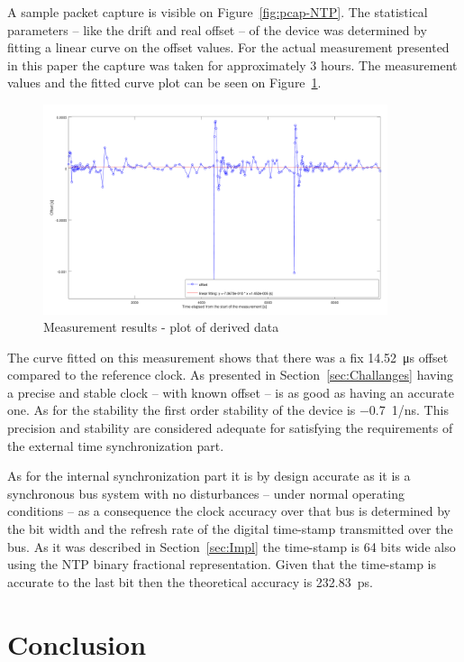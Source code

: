 \documentclass[article]{IEEEtran}
\begin{document}
A sample packet capture is visible on Figure~\ref{fig:pcap-NTP}. The statistical parameters -- like the drift and real offset -- of the device was determined by
fitting a linear curve on the offset values. For the actual measurement presented in this paper the capture was taken for approximately 3 hours. 
The measurement values and the fitted curve plot can be seen on Figure~\ref{fig:results}.


\begin{figure}[!htb]
    \centering
    \includegraphics[width=0.9\textwidth]{figures_raw/plot2.png}
    \caption{Measurement results - plot of derived data}
    \label{fig:results}
\end{figure}

The curve fitted on this measurement shows that there was a fix \SI{14.52}{\micro\second} offset compared to the reference clock. As presented in Section~\ref{sec:Challanges} 
having a precise and stable clock -- with known offset -- is as good as having an accurate one. As for the stability the first order stability of the 
device is \SI{-0.7}{1/\nano\second}. This precision and stability are considered adequate for satisfying the requirements of the external time synchronization part.


As for the internal synchronization part it is by design accurate as it is a synchronous bus system with no disturbances -- under normal operating conditions -- as a
consequence the clock accuracy over that bus is determined by the bit width and the refresh rate of the digital time-stamp transmitted over the bus. As it was described in Section~\ref{sec:Impl} the 
time-stamp is 64 bits wide also using the NTP binary fractional representation. Given that the time-stamp is accurate to the last bit then the theoretical accuracy is \SI{232.83}{\pico\second}.


\section{Conclusion}
\end{document}
